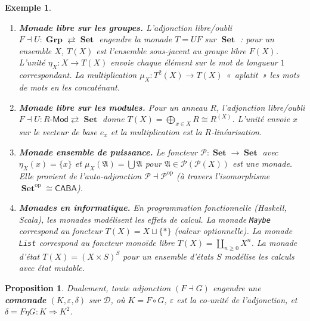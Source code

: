 \documentclass[a4paper,12pt]{book}
\DeclareMathOperator{\Set}{\mathbf{Set}}
\DeclareMathOperator{\Grp}{\mathbf{Grp}}
\newcommand{\op}{\mathrm{op}}
\newtheorem{proposition}[theoreme]{Proposition}
\newtheorem{exemple}[theoreme]{Exemple}
\begin{document}
\begin{exemple}\label{ex:monades-adjonctions}
\begin{enumerate}[label=(\roman*)]
\item \textbf{Monade libre sur les groupes.}%
    L'adjonction libre/oubli $F \dashv U \colon \Grp \rightleftarrows \Set$
    engendre la monade $T = UF$ sur $\Set$ : pour un ensemble $X$,
    $T(X)$ est l'ensemble sous-jacent au groupe libre $F(X)$.
    L'unité $\eta_X \colon X \to T(X)$ envoie chaque élément sur le
    mot de longueur $1$ correspondant. La multiplication
    $\mu_X \colon T^2(X) \to T(X)$ «~aplatit~» les mots de mots
    en les concaténant.

\item \textbf{Monade libre sur les modules.}%
    Pour un anneau $R$, l'adjonction libre/oubli
    $F \dashv U \colon R\text{-}\mathsf{Mod} \rightleftarrows \Set$
    donne $T(X) = \bigoplus_{x \in X} R \cong R^{(X)}$.
    L'unité envoie $x$ sur le vecteur de base $e_x$
    et la multiplication est la $R$-linéarisation.

\item \textbf{Monade ensemble de puissance.}%
    Le foncteur $\mathcal{P} \colon \Set \to \Set$
    avec $\eta_X(x) = \{x\}$ et $\mu_X(\mathfrak{A}) = \bigcup \mathfrak{A}$
    pour $\mathfrak{A} \in \mathcal{P}(\mathcal{P}(X))$
    est une monade. Elle provient de l'auto-adjonction
    $\mathcal{P} \dashv \mathcal{P}^{\op}$ (à travers l'isomorphisme
    $\Set^{\op} \cong \mathsf{CABA}$).

\item \textbf{Monades en informatique.}%
    En programmation fonctionnelle (Haskell, Scala), les monades modélisent
    les effets de calcul. La monade \texttt{Maybe} correspond au foncteur
    $T(X) = X \sqcup \{*\}$ (valeur optionnelle). La monade \texttt{List}
    correspond au foncteur \emph{monoïde libre} $T(X) = \coprod_{n \geq 0} X^n$.
    La monade d'état $T(X) = (X \times S)^S$ pour un ensemble d'états $S$
    modélise les calculs avec état mutable.
\end{enumerate}
\end{exemple}

\begin{proposition}\label{prop:comonade}
Dualement, toute adjonction $(F \dashv G)$ engendre une \textbf{comonade}
$(K, \varepsilon, \delta)$ sur $\mathcal{D}$, où
$K = F \circ G$, $\varepsilon$ est la co-unité de l'adjonction,
et $\delta = F\eta G \colon K \Rightarrow K^2$.
\end{proposition}
\end{document}
